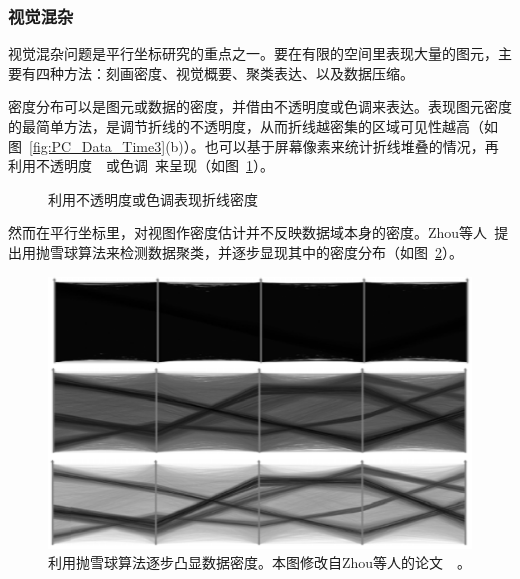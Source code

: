 \documentclass[12pt,twocolumn]{article}
\begin{document}
\subsubsection{视觉混杂}

视觉混杂问题是平行坐标研究的重点之一。要在有限的空间里表现大量的图元，主要有四种方法：刻画密度、视觉概要、聚类表达、以及数据压缩。

密度分布可以是图元或数据的密度，并借由不透明度或色调来表达。表现图元密度的最简单方法，是调节折线的不透明度，从而折线越密集的区域可见性越高（如图~\ref{fig:PC_Data_Time3}(b)）。也可以基于屏幕像素来统计折线堆叠的情况，再利用不透明度~\citep{artero2004uncovering}~\citep{johansson2007depth}或色调~\citep{mcdonnell2008illustrative}来呈现（如图~\ref{fig:PC_Design_Density1}）。

\begin{figure}[!htb]
\centering
{}
\caption{\label{fig:PC_Design_Density1}利用不透明度或色调表现折线密度}
\end{figure}

然而在平行坐标里，对视图作密度估计并不反映数据域本身的密度。Zhou等人~\citep{zhou2009splatting}提出用抛雪球算法来检测数据聚类，并逐步显现其中的密度分布（如图~\ref{fig:PC_Design_Density2}）。

\begin{figure}[!htb]
\centering
\includegraphics[width=0.8\linewidth]{images/PC_Design_Density3.eps}
\caption{\label{fig:PC_Design_Density2}利用抛雪球算法逐步凸显数据密度。本图修改自Zhou等人的论文~\citep{zhou2009splatting}~。
}
\end{figure}
\end{document}
